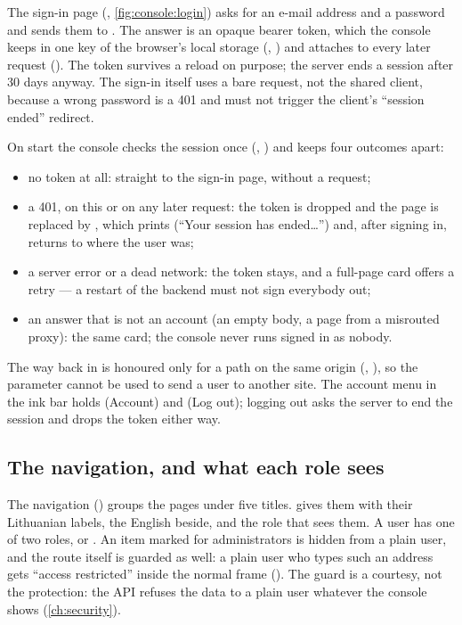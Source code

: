 The sign-in page (, \cref{fig:console:login}) asks for an e-mail
address and a password and sends them to . The answer is an opaque
bearer token, which the console keeps in one key of the browser's local storage
(, ) and attaches to every later request
(). The token survives a reload on purpose; the server ends a session after
30 days anyway. The sign-in itself uses a bare request, not the shared client, because a wrong
password is a 401 and must not trigger the client's \enquote{session ended} redirect.

On start the console checks the session once (, )
and keeps four outcomes apart:

\begin{itemize}
  \item no token at all: straight to the sign-in page, without a request;
  \item a 401, on this or on any later request: the token is dropped and the page is replaced by
    , which prints 
    (\enquote{Your session has ended\ldots}) and, after signing in, returns to where the user
    was;
  \item a server error or a dead network: the token stays, and a full-page card offers a retry
    --- a restart of the backend must not sign everybody out;
  \item an answer that is not an account (an empty body, a page from a misrouted proxy): the
    same card; the console never runs signed in as nobody.
\end{itemize}

The way back in  is honoured only for a path on the same origin
(, ), so the parameter cannot be used to send a user to
another site. The account menu in the ink bar holds  (Account) and 
(Log out); logging out asks the server to end the session and drops the token either way.

\subsection{The navigation, and what each role sees}\label{sec:console:nav}

The navigation () groups the pages under five titles.
 gives them with their Lithuanian labels, the English beside, and the
role that sees them. A user has one of two roles,  or . An item marked
for administrators is hidden from a plain user, and the route itself is guarded as well: a
plain user who types such an address gets \enquote{access restricted} inside the normal frame
(). The guard is a courtesy, not the protection: the API refuses the data
to a plain user whatever the console shows (\cref{ch:security}).

